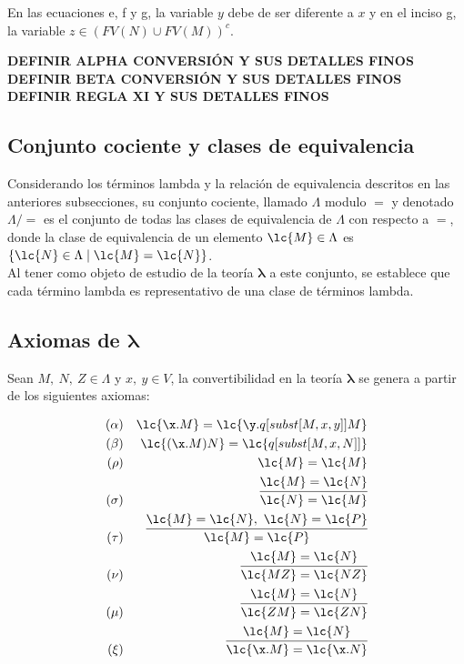 En las ecuaciones e, f y g, la variable $y$ debe de ser diferente a $x$ y en el
inciso g, la variable $z \in (FV(N) \cup FV(M))^c$.


\textbf{DEFINIR ALPHA CONVERSIÓN Y SUS DETALLES FINOS}\\

\textbf{DEFINIR BETA CONVERSIÓN Y SUS DETALLES FINOS}\\

\textbf{DEFINIR REGLA XI Y SUS DETALLES FINOS}\\

\subsection{Conjunto cociente y clases de equivalencia}\label{sec:1.2.3}

Considerando los términos lambda y la relación de equivalencia descritos en las
anteriores subsecciones, su conjunto cociente, llamado \(\Lambda\) modulo \(=\)
y denotado \(\Lambda / =\) es el conjunto de todas las clases de equivalencia de
\(\Lambda\) con respecto a \(=\), donde la clase de equivalencia de un elemento
\(\lc{M}\in \Lambda\) es \(\left\{ \lc{N} \in \Lambda \mid \lc{M} = \lc{N}
  \right\}\). \\

Al tener como objeto de estudio de la teoría \(\boldsymbol{\lambda}\) a
este conjunto, se establece que cada término lambda es representativo de una
clase de términos lambda.\\



\subsection{Axiomas de
\texorpdfstring{$\boldsymbol\lambda$}{lambda}} \label{sec:1.2.4}

Sean \(M,\ N,\ Z\in \Lambda\) y \(x,\ y\in V\), la convertibilidad en la teoría
\(\boldsymbol\lambda\) se genera a partir de los siguientes axiomas:

\begin{align}
  (\alpha) &  & \lc{\x.M}=\lc{\y.q[subst[M,x,y]]M} \\
  (\beta)  &  & \lc{(\x.M)N}=\lc{q[subst[M,x,N]]} \\
  (\rho)   &  & \lc{M}=\lc{M} \\
  (\sigma) &  & \infer{\lc{N}=\lc{M}}{\lc{M}=\lc{N}} \\
  (\tau)   &  & \infer{\lc{M}=\lc{P}}{\lc{M}=\lc{N},\ \lc{N}=\lc{P}} \\
  (\nu)    &  & \infer{\lc{M Z}=\lc{N Z}}{\lc{M}=\lc{N}} \\
  (\mu)    &  & \infer{\lc{Z M}=\lc{Z N}}{\lc{M}=\lc{N}} \\
  (\xi)    &  & \infer{\lc{\x.M}=\lc{\x.N}}{\lc{M}=\lc{N}}
\end{align}


